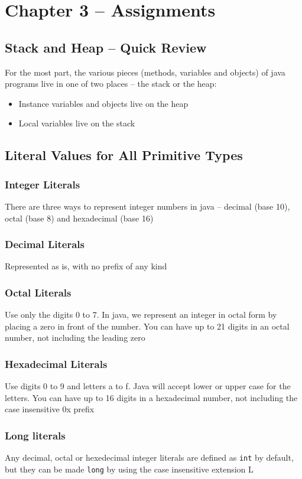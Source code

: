\section{Chapter 3 -- Assignments}
\subsection{Stack and Heap -- Quick Review}
For the most part, the various pieces (methods, variables and objects) of java 
programs live in one of two places -- the stack or the heap:
\begin{itemize}
    \item Instance variables and objects live on the heap
    \item Local variables live on the stack
\end{itemize}

\subsection{Literal Values for All Primitive Types}
\subsubsection{Integer Literals}
There are three ways to represent integer numbers in java -- decimal (base 10), 
octal (base 8) and hexadecimal (base 16)

\subsubsection{Decimal Literals}
Represented as is, with no prefix of any kind

\subsubsection{Octal Literals}
Use only the digits 0 to 7. In java, we represent an integer in octal form by 
placing a zero in front of the number. You can have up to 21 digits in an octal 
number, not including the leading zero

\subsubsection{Hexadecimal Literals}
Use digits 0 to 9 and letters a to f. Java will accept lower or upper case for 
the letters. You can have up to 16 digits in a hexadecimal number, not 
including the case insensitive 0x prefix

\subsubsection{Long literals}
Any decimal, octal or hexedecimal integer literals are defined as \verb#int# by 
default, but they can be made \verb#long# by using the case insensitive
extension L

